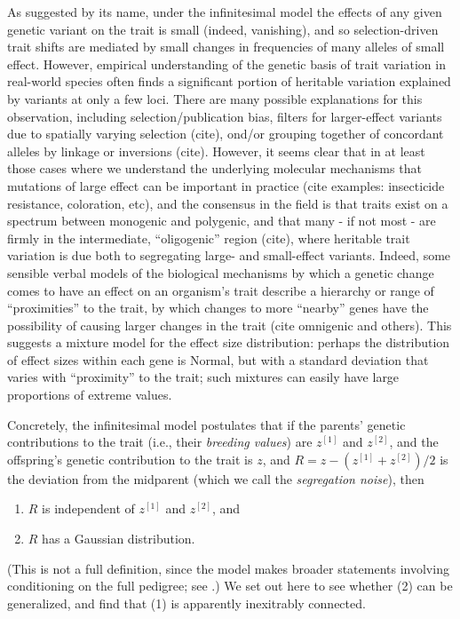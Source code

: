 \documentclass{article}
\theoremstyle{remark}
\theoremstyle{definition}
\begin{document}
As suggested by its name, under the infinitesimal model the effects of any given genetic variant on the trait
is small (indeed, vanishing),
and so selection-driven trait shifts are mediated by small changes in frequencies of many alleles of small effect.
However, empirical understanding of the genetic basis of trait variation in real-world species
often finds a significant portion of heritable variation explained by variants at only a few loci.
There are many possible explanations for this observation,
including selection/publication bias,
filters for larger-effect variants due to spatially varying selection (cite),
ond/or grouping together of concordant alleles by linkage or inversions (cite).
However, it seems clear that in at least those cases where we understand the underlying molecular mechanisms
that mutations of large effect can be important in practice
(cite examples: insecticide resistance, coloration, etc),
and the consensus in the field is that traits exist on a spectrum between monogenic and polygenic,
and that many - if not most - are firmly in the intermediate, ``oligogenic'' region (cite),
where heritable trait variation is due both to segregating large- and small-effect variants.
Indeed, some sensible verbal models of the biological mechanisms by which a genetic change
comes to have an effect on an organism's trait
describe a hierarchy or range of ``proximities'' to the trait,
by which changes to more ``nearby'' genes have the possibility of causing larger changes in the trait
(cite omnigenic and others).
This suggests a mixture model for the effect size distribution:
perhaps the distribution of effect sizes within each gene is Normal,
but with a standard deviation that varies with ``proximity'' to the trait;
such mixtures can easily have large proportions of extreme values.

Concretely, the infinitesimal model postulates that
if the parents' genetic contributions to the trait (i.e., their \emph{breeding values})
are $z^{[1]}$ and $z^{[2]}$,
and the offspring's genetic contribution to the trait is $z$,
and $R = z - (z^{[1]} + z^{[2]})/2$ is the deviation from the midparent
(which we call the \emph{segregation noise}), then
\begin{enumerate}
    \item $R$ is independent of $z^{[1]}$ and $z^{[2]}$, and
    \item $R$ has a Gaussian distribution.
\end{enumerate}
(This is not a full definition,
since the model makes broader statements involving conditioning on the full pedigree;
see \citet{barton2017infinitesimal}.)
We set out here to see whether (2) can be generalized,
and find that (1) is apparently inexitrably connected.
\end{document}
